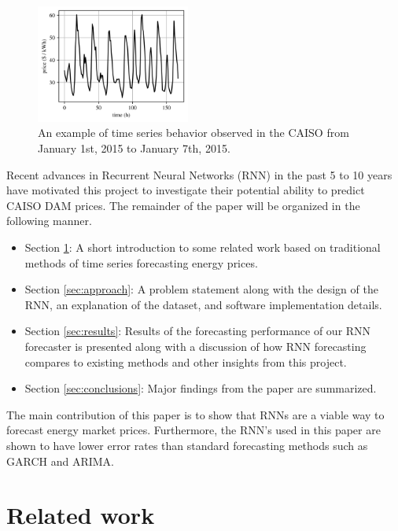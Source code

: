 \documentclass[sigconf]{acmart}
\begin{document}
\begin{figure}[h]
\includegraphics[width=0.45\textwidth]{fig_1.png}
\caption{An example of time series behavior observed in the CAISO from January 1st, 2015 to January 7th, 2015.}
\label{fig:ex_prices}
\end{figure}

Recent advances in Recurrent Neural Networks (RNN) in the past 5 to 10 years have motivated this project to investigate their potential ability to predict CAISO DAM prices. The remainder of the paper will be organized in the following manner.

\begin{itemize}
	\item Section \ref{sec:work}: A short introduction to some related work based on traditional methods of time series forecasting energy prices.
	\item Section \ref{sec:approach}: A problem statement along with the design of the RNN, an explanation of the dataset, and software implementation details.
	\item Section \ref{sec:results}: Results of the forecasting performance of our RNN forecaster is presented along with a discussion of how RNN forecasting compares to existing methods and other insights from this project.
	\item Section \ref{sec:conclusions}: Major findings from the paper are summarized.
\end{itemize}

The main contribution of this paper is to show that RNNs are a viable way to forecast energy market prices. Furthermore, the RNN's used in this paper are shown to have lower error rates than standard forecasting methods such as GARCH and ARIMA. 

\section{Related work}
\label{sec:work}
\end{document}
